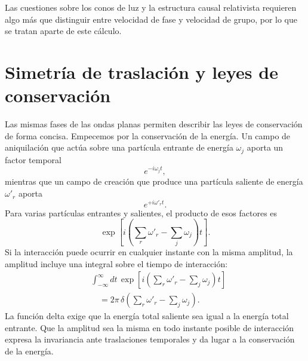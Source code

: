 \begin{classroomqa}\end{classroomqa}

Las cuestiones sobre los conos de luz y la estructura causal relativista requieren algo más que distinguir entre velocidad de fase y velocidad de grupo, por lo que se tratan aparte de este cálculo.

\section{Simetría de traslación y leyes de conservación}

Las mismas fases de las ondas planas permiten describir las leyes de conservación de forma concisa. Empecemos por la conservación de la energía. Un campo de aniquilación que actúa sobre una partícula entrante de energía \(\omega_j\) aporta un factor temporal
\begin{equation}
e^{-i\omega_j t},
\end{equation}
mientras que un campo de creación que produce una partícula saliente de energía \(\omega'_r\) aporta
\begin{equation}
e^{+i\omega'_r t}.
\end{equation}
Para varias partículas entrantes y salientes, el producto de esos factores es
\begin{equation}
\exp\!\left[
i\left(\sum_r\omega'_r-\sum_j\omega_j\right)t
\right].
\end{equation}
Si la interacción puede ocurrir en cualquier instante con la misma amplitud, la amplitud incluye una integral sobre el tiempo de interacción:
\begin{equation}
\begin{aligned}
&\int_{-\infty}^{\infty}dt\,
\exp\!\left[
i\left(\sum_r\omega'_r-\sum_j\omega_j\right)t
\right]
\\
&\quad =2\pi\,
\delta\!\left(\sum_r\omega'_r-\sum_j\omega_j\right).
\end{aligned}
\end{equation}
La función delta exige que la energía total saliente sea igual a la energía total entrante. Que la amplitud sea la misma en todo instante posible de interacción expresa la invariancia ante traslaciones temporales y da lugar a la conservación de la energía.

